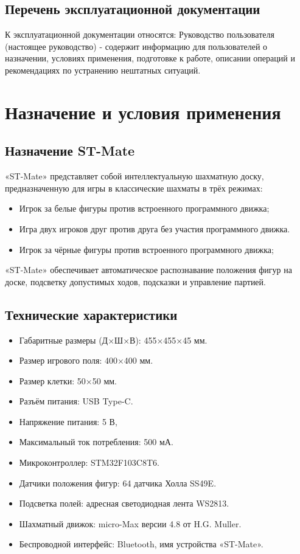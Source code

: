 \documentclass[a4paper,12pt]{article}
\begin{document}
\subsection{Перечень эксплуатационной документации}
К эксплуатационной документации относятся:
Руководство пользователя (настоящее руководство) - содержит информацию для пользователей о назначении, условиях применения, подготовке к работе, описании операций и рекомендациях по устранению нештатных ситуаций.

\section{Назначение и условия применения}
\label{sec:purpose}

\subsection{Назначение ST-Mate}
«ST-Mate» представляет собой интеллектуальную шахматную доску, предназначенную для игры в классические шахматы в трёх режимах:
\begin{itemize}
    \item Игрок за белые фигуры против встроенного программного движка;
    \item Игра двух игроков друг против друга без участия программного движка.
    \item Игрок за чёрные фигуры против встроенного программного движка;
\end{itemize}

«ST-Mate» обеспечивает автоматическое распознавание положения фигур на доске, подсветку допустимых ходов, подсказки и управление партией.

\subsection{Технические характеристики}

\begin{itemize}
    \item Габаритные размеры (Д×Ш×В): 455×455×45 мм.
    \item Размер игрового поля: 400×400 мм.
    \item Размер клетки: 50×50 мм.
    \item Разъём питания: USB Type-C.
    \item Напряжение питания: 5 В,
    \item Максимальный ток потребления: 500 мА.
    \item Микроконтроллер: STM32F103C8T6.
    \item Датчики положения фигур: 64 датчика Холла SS49E.
    \item Подсветка полей: адресная светодиодная лента WS2813.
    \item Шахматный движок: micro-Max версии 4.8 от H.G. Muller.
    \item Беспроводной интерфейс: Bluetooth, имя устройства «ST-Mate».
\end{itemize}
\end{document}
